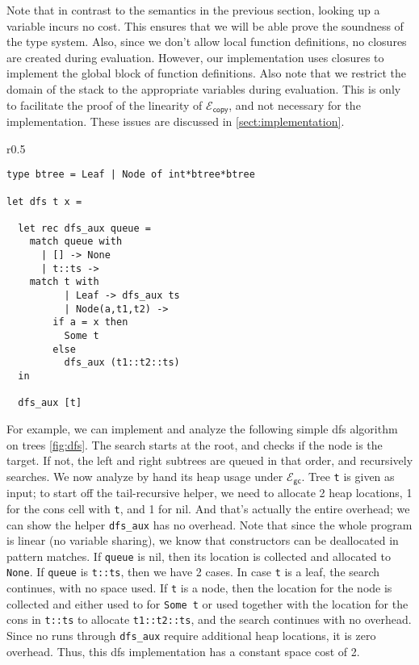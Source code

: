 \documentclass{easychair}
\newcommand{\ms}[1]{\ensuremath{\mathsf{#1}}}
\newcommand{\gcSem}{\ensuremath{\mathcal{E}_{\ms{gc}}}}
\newcommand{\copySem}{\ensuremath{\mathcal{E}_{\ms{copy}}}}
\theoremstyle{definition}
\begin{document}
Note that in contrast to the semantics in the previous section, looking up a variable incurs no
cost. This ensures that we will be able prove the soundness of the type system. 
Also, since we don't allow local function definitions, no closures are created 
during evaluation. However, our implementation uses closures to implement the global block of 
function definitions. Also note that we restrict the domain of the stack to the appropriate
variables during evaluation. This is only to facilitate the proof of the linearity of \copySem, 
and not necessary for the implementation. These issues are discussed in \ref{sect:implementation}.

\begin{wrapfigure}{r}{0.5\textwidth}
	\vspace{-20pt}
		\begin{center}
\begin{verbatim}
type btree = Leaf | Node of int*btree*btree

let dfs t x =

  let rec dfs_aux queue =
    match queue with
      | [] -> None
      | t::ts -> 
	match t with
          | Leaf -> dfs_aux ts
          | Node(a,t1,t2) -> 
	    if a = x then 
	      Some t 
	    else 
	      dfs_aux (t1::t2::ts)
  in

  dfs_aux [t]
\end{verbatim}
			\end{center}
				\vspace{-20pt}
			\caption{dfs algorithm}
		\vspace{-10pt}
\label{fig:dfs}
\end{wrapfigure}


For example, we can implement and analyze the following simple dfs algorithm on trees 
\ref{fig:dfs}.
The search starts at the root, and checks if the node is the target. If not, 
the left and right subtrees are queued in that order, and recursively searches.
We now analyze by hand its heap usage under \gcSem. Tree \texttt{t} is given 
as input; to start off the tail-recursive helper, we need to allocate 2 heap locations,
1 for the cons cell with \texttt{t}, and 1 for nil. And that's actually the entire overhead; 
we can show the helper \texttt{dfs\_aux} has no overhead. Note that since the whole program is 
linear (no variable sharing), we know that constructors can be deallocated in pattern matches. 
If \texttt{queue} is nil, then its location is collected and allocated to \texttt{None}.
If \texttt{queue} is \texttt{t::ts}, then we have 2 cases. In case \texttt{t} is a leaf, 
the search continues, with no space used. If \texttt{t} is a node, then the location for the node
is collected and either used to for \texttt{Some t} or used together with the location for 
the cons in \texttt{t::ts} to allocate \texttt{t1::t2::ts}, and the search continues with
no overhead. Since no runs through \texttt{dfs\_aux} require additional heap locations, 
it is zero overhead. Thus, this dfs implementation has a constant space cost of 2.
\end{document}
